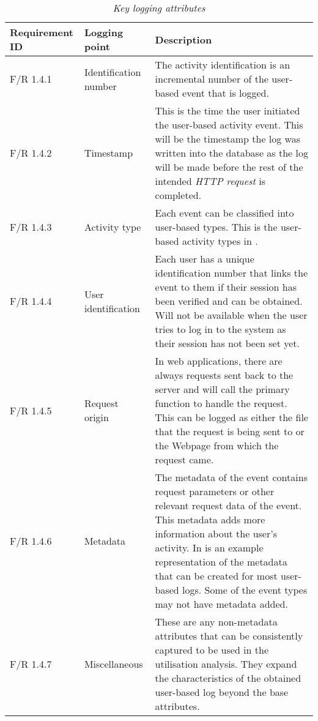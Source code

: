 \begin{table}[!htb]
	\centering
	\caption[Key logging attributes]
	{\textit{Key logging attributes}}
	\label{tbl:ch2_keyLoggingAttributes}
	\begin{tabularx}{\textwidth}{|l|l|X|}
		\hline \textbf{Requirement ID} & \textbf{Logging point} & \textbf{Description} \\
		\hline F/R 1.4.1 & Identification number & The activity identification is an incremental number of the user-based event that is logged.\\
		\hline F/R 1.4.2 & Timestamp & This is the time the user initiated the user-based activity event. This will be the timestamp the log was written into the database as the log will be made before the rest of the intended \textit{HTTP request} is completed. \\
		\hline F/R 1.4.3 & Activity type & Each event can be classified into user-based types. This is the user-based activity types in \Cref{tbl:ch2_userActivityTypes}.\\
		\hline F/R 1.4.4 & User identification & Each user has a unique identification number that links the event to them if their session has been verified and can be obtained. Will not be available when the user tries to log in to the system as their session has not been set yet. \\
		\hline F/R 1.4.5 & Request origin & In web applications, there are always requests sent back to the server and will call the primary function to handle the request. This can be logged as either the file that the request is being sent to or the Webpage from which the request came. \\
		\hline F/R 1.4.6 & Metadata & The metadata of the event contains request parameters or other relevant request data of the event. This metadata adds more information about the user's activity.
		In \Cref{fig:Ch2_Metadata_Json_Example} is an example representation of the metadata that can be created for most user-based logs. Some of the event types may not have metadata added. \\
		\hline F/R 1.4.7 & Miscellaneous & These are any non-metadata attributes that can be consistently captured to be used in the utilisation analysis. They expand the characteristics of the obtained user-based log beyond the base attributes. \\ \hline
	\end{tabularx}
\end{table}

\clearpage


